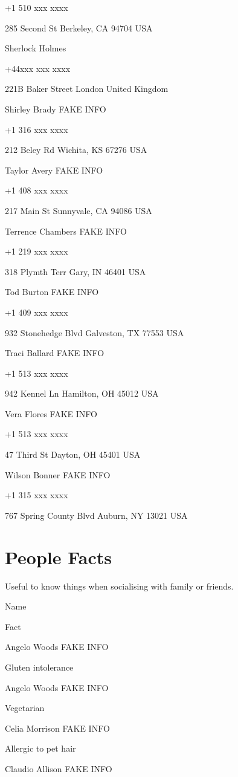 \documentclass[]{book}
\theoremstyle{definition}
\theoremstyle{definition}
\theoremstyle{definition}
\theoremstyle{remark}
\begin{document}
+1 510 xxx xxxx

285 Second St Berkeley, CA 94704 USA

Sherlock Holmes

+44xxx xxx xxxx

221B Baker Street London United Kingdom

Shirley Brady FAKE INFO

+1 316 xxx xxxx

212 Beley Rd Wichita, KS 67276 USA

Taylor Avery FAKE INFO

+1 408 xxx xxxx

217 Main St Sunnyvale, CA 94086 USA

Terrence Chambers FAKE INFO

+1 219 xxx xxxx

318 Plymth Terr Gary, IN 46401 USA

Tod Burton FAKE INFO

+1 409 xxx xxxx

932 Stonehedge Blvd Galveston, TX 77553 USA

Traci Ballard FAKE INFO

+1 513 xxx xxxx

942 Kennel Ln Hamilton, OH 45012 USA

Vera Flores FAKE INFO

+1 513 xxx xxxx

47 Third St Dayton, OH 45401 USA

Wilson Bonner FAKE INFO

+1 315 xxx xxxx

767 Spring County Blvd Auburn, NY 13021 USA

\chapter{People Facts}\label{people-facts}

Useful to know things when socialising with family or friends.

Name

Fact

Angelo Woods FAKE INFO

Gluten intolerance

Angelo Woods FAKE INFO

Vegetarian

Celia Morrison FAKE INFO

Allergic to pet hair

Claudio Allison FAKE INFO
\end{document}
